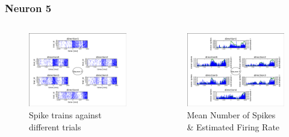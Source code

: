 \documentclass{beamer}
\begin{document}
\begin{frame}\frametitle{Neuron 5}
\begin{columns}
 \begin{column}{5cm}
  \begin{figure}
   \includegraphics[scale=0.25]{fig/neuron5spikes.png}
   \caption{Spike trains against different trials}
  \end{figure}
 \end{column}
 \begin{column}{5cm}
  \begin{figure}
   \includegraphics[scale=0.25]{fig/neuron5rates}
   \caption{Mean Number of Spikes \& Estimated Firing Rate}
  \end{figure}
 \end{column}
\end{columns}
\end{frame}
\end{document}
